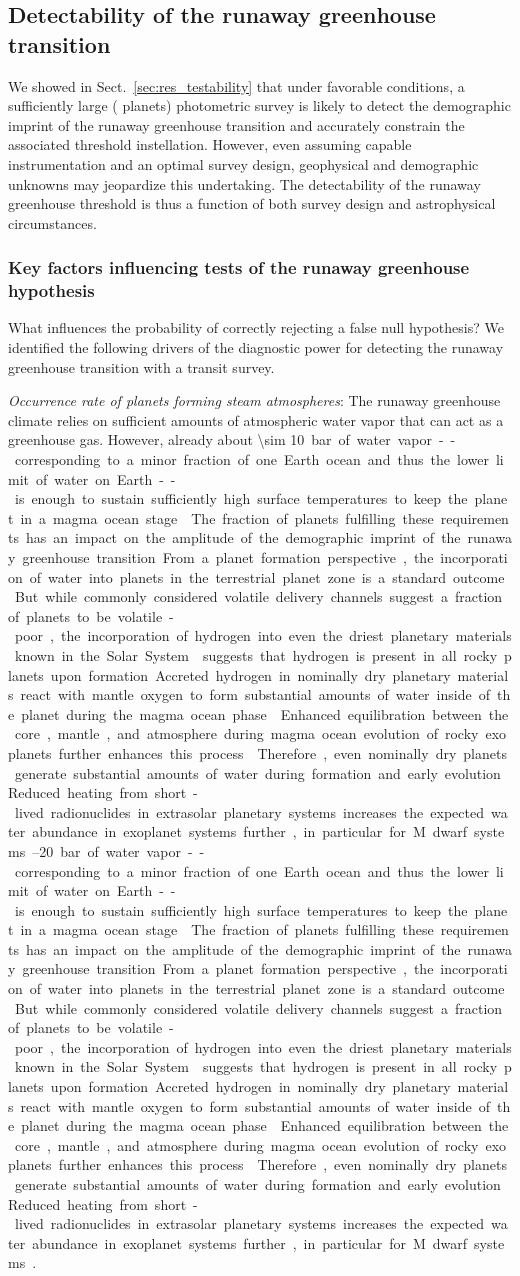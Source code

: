 \documentclass[twocolumn,twocolappendix]{aastex631}
\begin{document}
\subsection{Detectability of the runaway greenhouse transition}
We showed in Sect.~\ref{sec:res_testability} that under favorable conditions, a sufficiently large ( planets) photometric survey is likely to detect the demographic imprint of the runaway greenhouse transition and accurately constrain the associated threshold instellation.
However, even assuming capable instrumentation and an optimal survey design, geophysical and demographic unknowns may jeopardize this undertaking.
The detectability of the runaway greenhouse threshold is thus a function of both survey design and astrophysical circumstances.

\subsubsection{Key factors influencing tests of the runaway greenhouse hypothesis}
What influences the probability of correctly rejecting a false null hypothesis?
We identified the following drivers of the diagnostic power for detecting the runaway greenhouse transition with a transit survey.

\textit{Occurrence rate of planets forming steam atmospheres}: The runaway greenhouse climate relies on sufficient amounts of atmospheric water vapor that can act as a greenhouse gas.
However, already about \SIrange{\sim 10}{20}~bar of water vapor -- corresponding to a minor fraction of one Earth ocean and thus the lower limit of water on Earth -- is enough to sustain sufficiently high surface temperatures to keep the planet in a magma ocean stage~\citep{Boukrouche2021,2021JGRE..12606711L}.
The fraction of planets fulfilling these requirements has an impact on the amplitude of the demographic imprint of the runaway greenhouse transition.
From a planet formation perspective, the incorporation of water into planets in the terrestrial planet zone is a standard outcome~\citep{2019PNAS..116.9723Z,Venturini2020}.
But while commonly considered volatile delivery channels suggest a fraction of planets to be volatile-poor, the incorporation of hydrogen into even the driest planetary materials known in the Solar System~\citep{2020Sci...369.1110P,2021PSJ.....2..244J} suggests that hydrogen is present in all rocky planets upon formation.
Accreted hydrogen in nominally dry planetary materials react with mantle oxygen to form substantial amounts of water inside of the planet during the magma ocean phase~\citep{Ikoma2018,2021ApJ...909L..22K,2020MNRAS.496.3755K,2022NatAs...6.1296K}.
Enhanced equilibration between the core, mantle, and atmosphere during magma ocean evolution of rocky exoplanets further enhances this process~\citep{2021ApJ...914L...4L,Schlichting2022}.
Therefore, even nominally dry planets generate substantial amounts of water during formation and early evolution.
Reduced heating from short-lived radionuclides in extrasolar planetary systems increases the expected water abundance in exoplanet systems further, in particular for M~dwarf systems~\citep{2022ApJ...938L...3L}.
\end{document}
